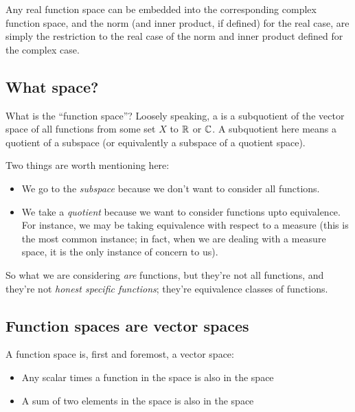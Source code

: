 \documentclass[a4paper]{amsart}
\begin{document}
Any real function space can be embedded into the corresponding complex
function space, and the norm (and inner product, if defined) for the
real case, are simply the restriction to the real case of the norm and
inner product defined for the complex case.

\subsection{What space?}

What is the ``function space''? Loosely speaking, a
 is a subquotient of the vector space of
all functions from some set $X$ to $\mathbb{R}$ or $\mathbb{C}$. A subquotient here
means a quotient of a subspace (or equivalently a subspace of a
quotient space).

Two things are worth mentioning here:

\begin{itemize}

\item We go to the {\em subspace} because we don't want to consider
  all functions.

\item We take a {\em quotient} because we want to consider functions
  upto equivalence. For instance, we may be taking equivalence with
  respect to a measure (this is the most common instance; in fact,
  when we are dealing with a measure space, it is the only instance of
  concern to us).

\end{itemize}

So what we are considering {\em are} functions, but they're not all
functions, and they're not {\em honest specific functions}; they're
equivalence classes of functions.

\subsection{Function spaces are vector spaces}

A function space is, first and foremost, a vector space:

\begin{itemize}

\item Any scalar times a function in the space is also in the space

\item A sum of two elements in the space is also in the space

\end{itemize}
\end{document}

